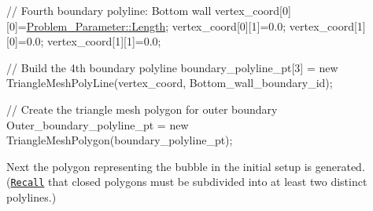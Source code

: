 \begin{DoxyCodeInclude}
 \textcolor{comment}{// Fourth boundary polyline: Bottom wall}
 vertex\_coord[0][0]=\hyperlink{namespaceProblem__Parameter_a7b67840fea463f29b53d12f7bd7cb34b}{Problem\_Parameter::Length};
 vertex\_coord[0][1]=0.0;
 vertex\_coord[1][0]=0.0;
 vertex\_coord[1][1]=0.0;

 \textcolor{comment}{// Build the 4th boundary polyline}
 boundary\_polyline\_pt[3] = \textcolor{keyword}{new} TriangleMeshPolyLine(vertex\_coord,
                                                    Bottom\_wall\_boundary\_id);
 
 \textcolor{comment}{// Create the triangle mesh polygon for outer boundary}
 Outer\_boundary\_polyline\_pt = \textcolor{keyword}{new} TriangleMeshPolygon(boundary\_polyline\_pt);

\end{DoxyCodeInclude}


Next the polygon representing the bubble in the initial setup is generated. (\href{../../../meshes/mesh_from_inline_triangle/html/index.html#polygonal}{\tt Recall} that closed polygons must be subdivided into at least two distinct polylines.)


